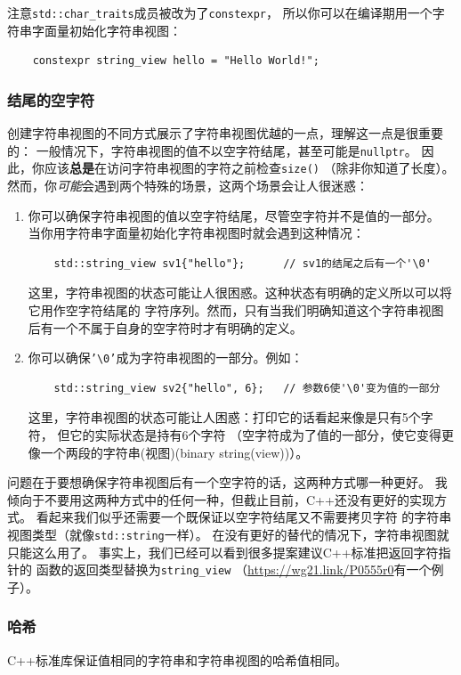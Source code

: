 注意\texttt{std::char\_traits}成员被改为了\texttt{constexpr}，
所以你可以在编译期用一个字符串字面量初始化字符串视图：\label{编译期字符串视图}
\begin{lstlisting}
    constexpr string_view hello = "Hello World!";
\end{lstlisting}

\subsubsection{结尾的空字符}
创建字符串视图的不同方式展示了字符串视图优越的一点，理解这一点是很重要的：
一般情况下，字符串视图的值不以空字符结尾，甚至可能是\texttt{nullptr}。
因此，你应该\textbf{总是}在访问字符串视图的字符之前检查\texttt{size()}
（除非你知道了长度）。
然而，你\emph{可能}会遇到两个特殊的场景，这两个场景会让人很迷惑：
\begin{enumerate}
    \item 你可以确保字符串视图的值以空字符结尾，尽管空字符并不是值的一部分。
    当你用字符串字面量初始化字符串视图时就会遇到这种情况：
    \begin{lstlisting}
    std::string_view sv1{"hello"};      // sv1的结尾之后有一个'\0'
    \end{lstlisting}
    这里，字符串视图的状态可能让人很困惑。这种状态有明确的定义所以可以将它用作空字符结尾的
    字符序列。然而，只有当我们明确知道这个字符串视图后有一个不属于自身的空字符时才有明确的定义。
    \item 你可以确保\texttt{'\textbackslash 0'}成为字符串视图的一部分。例如：
    \begin{lstlisting}
    std::string_view sv2{"hello", 6};   // 参数6使'\0'变为值的一部分
    \end{lstlisting}
    这里，字符串视图的状态可能让人困惑：打印它的话看起来像是只有5个字符，
    但它的实际状态是持有6个字符
    （空字符成为了值的一部分，使它变得更像一个两段的字符串(视图)(binary string(view))）。
\end{enumerate}
问题在于要想确保字符串视图后有一个空字符的话，这两种方式哪一种更好。
我倾向于不要用这两种方式中的任何一种，但截止目前，C++还没有更好的实现方式。
看起来我们似乎还需要一个既保证以空字符结尾又不需要拷贝字符
的字符串视图类型（就像\texttt{std::string}一样）。
在没有更好的替代的情况下，字符串视图就只能这么用了。
事实上，我们已经可以看到很多提案建议C++标准把返回字符指针的
函数的返回类型替换为\texttt{string\_view}
（\url{https://wg21.link/P0555r0}有一个例子）。

\subsubsection{哈希}
C++标准库保证值相同的字符串和字符串视图的哈希值相同。

